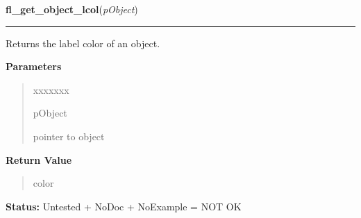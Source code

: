 \hspace{.8\funcindent}\begin{boxedminipage}{\funcwidth}

    \raggedright \textbf{fl\_get\_object\_lcol}(\textit{pObject})

    \vspace{-1.5ex}

    \rule{\textwidth}{0.5\fboxrule}
\setlength{\parskip}{2ex}
    Returns the label color of an object.

\setlength{\parskip}{1ex}
      \textbf{Parameters}
      \vspace{-1ex}

      \begin{quote}
        \begin{Ventry}{xxxxxxx}

          \item[pObject]

          pointer to object

        \end{Ventry}

      \end{quote}

      \textbf{Return Value}
    \vspace{-1ex}

      \begin{quote}
      color

      \end{quote}

\textbf{Status:} Untested + NoDoc + NoExample = NOT OK



    \end{boxedminipage}

    \label{xformslib:library:fl_set_object_return}

    \vspace{0.5ex}

